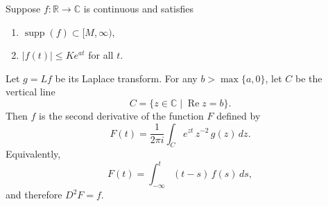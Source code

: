 Suppose $f \colon \mathbb{R} \to \mathbb{C}$ is continuous and satisfies
\begin{enumerate}
\item $\operatorname{supp}(f) \subset [M, \infty)$,
\item $|f(t)| \leq K e^{at}$ for all $t$.
\end{enumerate}
Let $g = Lf$ be its Laplace transform. For any $b > \max\{a, 0\}$, let $C$ be the vertical line
$$C = \{z \in \mathbb{C} \mid \operatorname{Re} z = b\}.$$
Then $f$ is the second derivative of the function $F$ defined by
$$F(t) = \frac{1}{2\pi i} \int_{C} e^{zt} \, z^{-2} \, g(z) \, dz.$$
Equivalently,
$$F(t) = \int_{-\infty}^{t} (t - s) \, f(s) \, ds,$$
and therefore $D^{2}F = f$.
